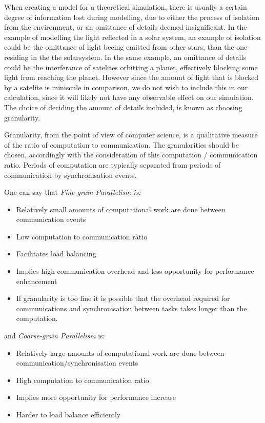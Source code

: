 When creating a model for a theoretical simulation, there is usually a certain degree of information lost during modelling, due to either the process of isolation from the environment, or an omittance of details deemed insignificant. In the example of modelling the light reflected in a solar system, an example of isolation could be the omittance of light beeing emitted from other stars, than the one residing in the the solarsystem. In the same example, an omittance of details could be the interferance of satelites orbitting a planet, effectively blocking some light from reaching the planet. However since the amount of light that is blocked by a satelite is miniscule in comparison, we do not wish to include this in our calculation, since it will likely not have any observable effect on our simulation. The choice of deciding the amount of details included, is known as choosing granularity.

Granularity, from the point of view of computer science, is a qualitative measure of the ratio of computation to communication. The granularities should be chosen, accordingly with the consideration of this computation / communication ratio. Periods of computation are typically separated from periods of communication by synchronisation events.

One can say that \emph{Fine-grain Parallelism is:}

\begin{itemize}
\item Relatively small amounts of computational work are done between communication events
\item Low computation to communication ratio
\item Facilitates load balancing
\item Implies high communication overhead and less opportunity for performance enhancement
\item If granularity is too fine it is possible that the overhead required for communications and synchronisation between tasks takes longer than the computation.
\end{itemize}

and \emph{Coarse-grain Parallelism} is:

\begin{itemize}
\item Relatively large amounts of computational work are done between communication/synchronisation events
\item High computation to communication ratio
\item Implies more opportunity for performance increase
\item Harder to load balance efficiently
\end{itemize}

